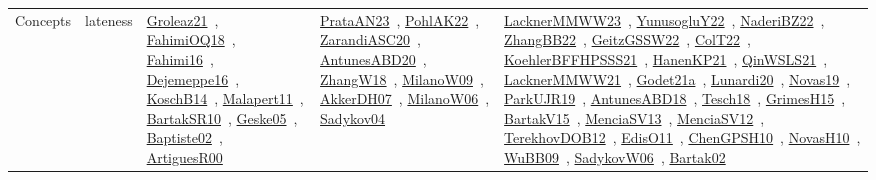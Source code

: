 {\begin{longtable}{lp{3cm}>{\raggedright\arraybackslash}p{6cm}>{\raggedright\arraybackslash}p{6cm}>{\raggedright\arraybackslash}p{8cm}}
Concepts & lateness & \href{works/Groleaz21.pdf}{Groleaz21}~\cite{Groleaz21}, \href{works/FahimiOQ18.pdf}{FahimiOQ18}~\cite{FahimiOQ18}, \href{works/Fahimi16.pdf}{Fahimi16}~\cite{Fahimi16}, \href{works/Dejemeppe16.pdf}{Dejemeppe16}~\cite{Dejemeppe16}, \href{works/KoschB14.pdf}{KoschB14}~\cite{KoschB14}, \href{works/Malapert11.pdf}{Malapert11}~\cite{Malapert11}, \href{works/BartakSR10.pdf}{BartakSR10}~\cite{BartakSR10}, \href{works/Geske05.pdf}{Geske05}~\cite{Geske05}, \href{works/Baptiste02.pdf}{Baptiste02}~\cite{Baptiste02}, \href{works/ArtiguesR00.pdf}{ArtiguesR00}~\cite{ArtiguesR00} & \href{works/PrataAN23.pdf}{PrataAN23}~\cite{PrataAN23}, \href{works/PohlAK22.pdf}{PohlAK22}~\cite{PohlAK22}, \href{works/ZarandiASC20.pdf}{ZarandiASC20}~\cite{ZarandiASC20}, \href{works/AntunesABD20.pdf}{AntunesABD20}~\cite{AntunesABD20}, \href{works/ZhangW18.pdf}{ZhangW18}~\cite{ZhangW18}, \href{works/MilanoW09.pdf}{MilanoW09}~\cite{MilanoW09}, \href{works/AkkerDH07.pdf}{AkkerDH07}~\cite{AkkerDH07}, \href{works/MilanoW06.pdf}{MilanoW06}~\cite{MilanoW06}, \href{works/Sadykov04.pdf}{Sadykov04}~\cite{Sadykov04} & \href{works/LacknerMMWW23.pdf}{LacknerMMWW23}~\cite{LacknerMMWW23}, \href{works/YunusogluY22.pdf}{YunusogluY22}~\cite{YunusogluY22}, \href{works/NaderiBZ22.pdf}{NaderiBZ22}~\cite{NaderiBZ22}, \href{works/ZhangBB22.pdf}{ZhangBB22}~\cite{ZhangBB22}, \href{works/GeitzGSSW22.pdf}{GeitzGSSW22}~\cite{GeitzGSSW22}, \href{works/ColT22.pdf}{ColT22}~\cite{ColT22}, \href{works/KoehlerBFFHPSSS21.pdf}{KoehlerBFFHPSSS21}~\cite{KoehlerBFFHPSSS21}, \href{works/HanenKP21.pdf}{HanenKP21}~\cite{HanenKP21}, \href{works/QinWSLS21.pdf}{QinWSLS21}~\cite{QinWSLS21}, \href{works/LacknerMMWW21.pdf}{LacknerMMWW21}~\cite{LacknerMMWW21}, \href{works/Godet21a.pdf}{Godet21a}~\cite{Godet21a}, \href{works/Lunardi20.pdf}{Lunardi20}~\cite{Lunardi20}, \href{works/Novas19.pdf}{Novas19}~\cite{Novas19}, \href{works/ParkUJR19.pdf}{ParkUJR19}~\cite{ParkUJR19}, \href{works/AntunesABD18.pdf}{AntunesABD18}~\cite{AntunesABD18}, \href{works/Tesch18.pdf}{Tesch18}~\cite{Tesch18}, \href{works/GrimesH15.pdf}{GrimesH15}~\cite{GrimesH15}, \href{works/BartakV15.pdf}{BartakV15}~\cite{BartakV15}, \href{works/MenciaSV13.pdf}{MenciaSV13}~\cite{MenciaSV13}, \href{works/MenciaSV12.pdf}{MenciaSV12}~\cite{MenciaSV12}, \href{works/TerekhovDOB12.pdf}{TerekhovDOB12}~\cite{TerekhovDOB12}, \href{works/EdisO11.pdf}{EdisO11}~\cite{EdisO11}, \href{works/ChenGPSH10.pdf}{ChenGPSH10}~\cite{ChenGPSH10}, \href{works/NovasH10.pdf}{NovasH10}~\cite{NovasH10}, \href{works/WuBB09.pdf}{WuBB09}~\cite{WuBB09}, \href{works/SadykovW06.pdf}{SadykovW06}~\cite{SadykovW06}, \href{works/Bartak02.pdf}{Bartak02}~\cite{Bartak02}\\

\end{longtable}}
